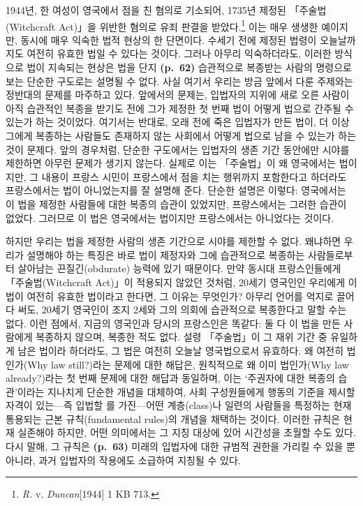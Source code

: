 1944년, 한 여성이 영국에서 점을 친 혐의로 기소되어, 1735년 제정된
「주술법(Witchcraft Act)」을 위반한 혐의로 유죄 판결을
받았다.\footnote{\emph{R.} v. \emph{Duncan}{[}1944{]} 1 KB 713.} 이는
매우 생생한 예이지만, 동시에 매우 익숙한 법적 현상의 한 단면이다. 수세기
전에 제정된 법령이 오늘날까지도 여전히 유효한 법일 수 있다는 것이다.
그러나 아무리 익숙하더라도, 이러한 방식으로 법이 지속되는 현상은 법을
단지 \textbf{(p.~62)} 습관적으로 복종받는 사람의 명령으로 보는 단순한
구도로는 설명될 수 없다. 사실 여기서 우리는 방금 앞에서 다룬 주제와는
정반대의 문제를 마주하고 있다. 앞에서의 문제는, 입법자의 지위에 새로
오른 사람이 아직 습관적인 복종을 받기도 전에 그가 제정한 첫 번째 법이
어떻게  법으로 간주될 수 있는가 하는 것이었다.
여기서는 반대로, 오래 전에 죽은 입법자가 만든 법이, 더 이상 그에게
복종하는 사람들도 존재하지 않는 사회에서 어떻게 
법으로 남을 수 있는가 하는 것이 문제다. 앞의 경우처럼, 단순한 구도에서는
입법자의 생존 기간 동안에만 시야를 제한하면 아무런 문제가 생기지 않는다.
실제로 이는 「주술법」이 왜 영국에서는 법이지만, 그 내용이 프랑스 시민이
프랑스에서 점을 치는 행위까지 포함한다고 하더라도 프랑스에서는 법이
아니었는지를 잘 설명해 준다. 단순한 설명은 이렇다: 영국에서는 이 법을
제정한 사람들에 대한 복종의 습관이 있었지만, 프랑스에서는 그러한 습관이
없었다. 그러므로 이 법은 영국에서는 법이지만 프랑스에서는 아니었다는
것이다.

하지만 우리는 법을 제정한 사람의 생존 기간으로 시야를 제한할 수 없다.
왜냐하면 우리가 설명해야 하는 특징은 바로 법이 제정자와 그에 습관적으로
복종하는 사람들로부터 살아남는 끈질긴(obdurate) 능력에 있기 때문이다.
만약 동시대 프랑스인들에게 「주술법(Witchcraft Act)」이 적용되지 않았던
것처럼, 20세기 영국인인 우리에게 이 법이 여전히 유효한 법이라고 한다면,
그 이유는 무엇인가? 아무리 언어를 억지로 끌어다 써도, 20세기 영국인이
조지 2세와 그의 의회에 습관적으로 복종한다고 말할 수는 없다. 이런
점에서, 지금의 영국인과 당시의 프랑스인은 똑같다: 둘 다 이 법을 만든
사람에게 복종하지 않으며, 복종한 적도 없다. 설령 「주술법」이 그 재위
기간 중 유일하게 남은 법이라 하더라도, 그 법은 여전히 오늘날
영국법으로서 유효하다. 왜 여전히 법인가(Why law still?)라는 문제에 대한
해답은, 원칙적으로 왜 이미 법인가(Why law already?)라는 첫 번째 문제에
대한 해답과 동일하며, 이는 `주권자에 대한 복종의 습관'이라는 지나치게
단순한 개념을 대체하여, 사회 구성원들에게 행동의 기준을 제시할 자격이
있는---즉 입법할 를 가진---어떤 계층(class)나 일련의
사람들을 특정하는 현재 통용되는 근본 규칙(fundamental rules)의 개념을
채택하는 것이다. 이러한 규칙은 현재 실존해야 하지만, 어떤 의미에서는 그
지칭 대상에 있어 시간성을 초월할 수도 있다. 다시 말해, 그 규칙은
\textbf{(p.~63)} 미래의 입법자에 대한 규범적 권한을 가리킬 수 있을 뿐
아니라, 과거 입법자의 작용에도 소급하여 지칭될 수 있다.

